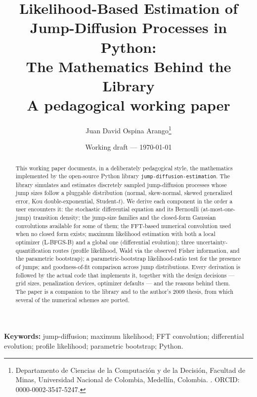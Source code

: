 \documentclass[11pt]{article}
\title{%
  Likelihood-Based Estimation of Jump-Diffusion Processes in Python:\\
  The Mathematics Behind the \code{jump-diffusion-estimation} Library\\[4pt]
  {\large A pedagogical working paper}%
}
\author{%
  Juan David Ospina Arango\thanks{%
    Departamento de Ciencias de la Computaci\'on y de la Decisi\'on,
    Facultad de Minas, Universidad Nacional de Colombia, Medell\'in, Colombia.
    \code{jdospina@gmail.com}. ORCID: 0000-0002-3547-5247.}%
}
\date{Working draft --- \today}
\theoremstyle{definition}
\theoremstyle{remark}
\newcommand{\code}[1]{\texttt{#1}}
\begin{document}
\maketitle

\begin{abstract}
\noindent
This working paper documents, in a deliberately pedagogical style, the
mathematics implemented by the open-source Python library
\code{jump-diffusion-estimation}. The library simulates and estimates
discretely sampled jump-diffusion processes whose jump sizes follow a
pluggable distribution (normal, skew-normal, skewed generalized error,
Kou double-exponential, Student-$t$). We derive each component in the order
a user encounters it: the stochastic differential equation and its
Bernoulli (at-most-one-jump) transition density; the jump-size families and
the closed-form Gaussian convolutions available for some of them; the
FFT-based numerical convolution used when no closed form exists; maximum
likelihood estimation with both a local optimizer (L-BFGS-B) and a global
one (differential evolution); three uncertainty-quantification routes
(profile likelihood, Wald via the observed Fisher information, and the
parametric bootstrap); a parametric-bootstrap likelihood-ratio test for the
presence of jumps; and goodness-of-fit comparison across jump
distributions. Every derivation is followed by the actual code that
implements it, together with the design decisions --- grid sizes,
penalization devices, optimizer defaults --- and the reasons behind them.
The paper is a companion to the library and to the author's 2009 thesis,
from which several of the numerical schemes are ported.
\end{abstract}

\vspace{1em}
\noindent\textbf{Keywords:} jump-diffusion; maximum likelihood; FFT
convolution; differential evolution; profile likelihood; parametric
bootstrap; Python.

\tableofcontents













\end{document}
